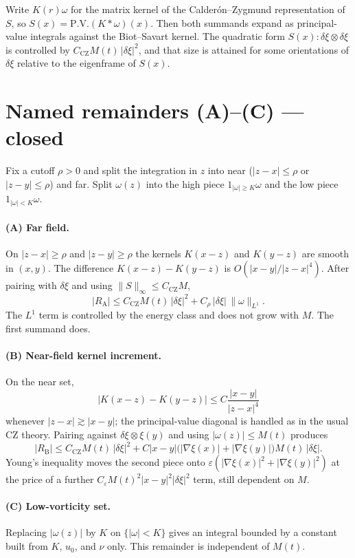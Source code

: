 \documentclass[11pt]{article}
\begin{document}
Write \( K(r)\omega \) for the matrix kernel of the Calder\'on--Zygmund representation of \( S \), so \( S(x)=\mathrm{P.V.}(K*\omega)(x) \). Then both summands expand as principal-value integrals against the Biot--Savart kernel. The quadratic form \( S(x):\delta\xi\otimes\delta\xi \) is controlled by \( C_{\mathrm{CZ}}M(t)\,|\delta\xi|^2 \), and that size is attained for some orientations of \( \delta\xi \) relative to the eigenframe of \( S(x) \).

\section{Named remainders (A)--(C) --- closed}
Fix a cutoff \( \rho>0 \) and split the integration in \( z \) into near (\( |z-x|\le\rho \) or \( |z-y|\le\rho \)) and far. Split \( \omega(z) \) into the high piece \( 1_{|\omega|\ge K}\omega \) and the low piece \( 1_{|\omega|<K}\omega \).

\paragraph{(A) Far field.}
On \( |z-x|\ge\rho \) and \( |z-y|\ge\rho \) the kernels \( K(x-z) \) and \( K(y-z) \) are smooth in \( (x,y) \). The difference \( K(x-z)-K(y-z) \) is \( O(|x-y|/|z-x|^4) \). After pairing with \( \delta\xi \) and using \( \|S\|_\infty\le C_{\mathrm{CZ}}M \),
\[
|R_{\mathrm{A}}|\le C_{\mathrm{CZ}}M(t)\,|\delta\xi|^2+C_\rho\,|\delta\xi|\,\|\omega\|_{L^1}.
\]
The \( L^1 \) term is controlled by the energy class and does not grow with \( M \). The first summand does.

\paragraph{(B) Near-field kernel increment.}
On the near set,
\[
\bigl|K(x-z)-K(y-z)\bigr|\le C\frac{|x-y|}{|z-x|^4}
\]
whenever \( |z-x|\gtrsim|x-y| \); the principal-value diagonal is handled as in the usual CZ theory. Pairing against \( \delta\xi\otimes\xi(y) \) and using \( |\omega(z)|\le M(t) \) produces
\[
|R_{\mathrm{B}}|\le C_{\mathrm{CZ}}M(t)\,|\delta\xi|^2+C|x-y|\bigl(|\nabla\xi(x)|+|\nabla\xi(y)|\bigr)M(t)\,|\delta\xi|.
\]
Young's inequality moves the second piece onto \( \varepsilon(|\nabla\xi(x)|^2+|\nabla\xi(y)|^2) \) at the price of a further \( C_\varepsilon M(t)^2|x-y|^2|\delta\xi|^2 \) term, still dependent on \( M \).

\paragraph{(C) Low-vorticity set.}
Replacing \( |\omega(z)| \) by \( K \) on \( \{|\omega|<K\} \) gives an integral bounded by a constant built from \( K \), \( u_0 \), and \( \nu \) only. This remainder is independent of \( M(t) \).
\end{document}
